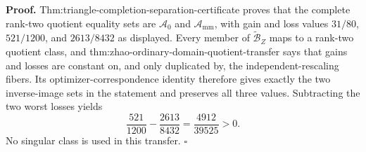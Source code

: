 \textbf{Proof.}
Thm:triangle-completion-separation-certificate proves that the complete rank-two quotient equality sets are \(\mathcal A_0\) and \(\mathcal A_{\mathrm{mm}}\), with gain and loss values \(31/80\), \(521/1200\), and \(2613/8432\) as displayed.  Every member of \(\widetilde{\mathcal B}_Z\) maps to a rank-two quotient class, and thm:zhao-ordinary-domain-quotient-transfer says that gains and losses are constant on, and only duplicated by, the independent-rescaling fibers.  Its optimizer-correspondence identity therefore gives exactly the two inverse-image sets in the statement and preserves all three values.  Subtracting the two worst losses yields
\[
\frac{521}{1200}-\frac{2613}{8432}=\frac{4912}{39525}>0.
\]
No singular class is used in this transfer. \(\square\)
